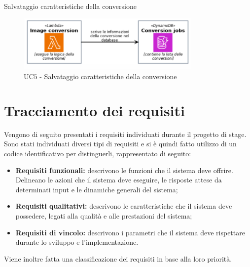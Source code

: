 \begin{usecase}{5}{Salvataggio caratteristiche della conversione}
    \begin{figure}[H]
        \centering
        \includegraphics[width=0.8\textwidth]{images/uc5.png}
        \caption{UC$5$ - Salvataggio caratteristiche della conversione}
    \end{figure}
    \label{uc:salvataggio-caratteristiche}
\end{usecase}
\clearpage

\section{Tracciamento dei requisiti}

Vengono di seguito presentati i requisiti individuati durante il progetto di
stage.\\
Sono stati individuati diversi tipi di requisiti e si è quindi fatto utilizzo di
un codice identificativo per distinguerli, rappresentato di seguito:
\begin{itemize}
    \item \textbf{Requisiti funzionali:} descrivono le funzioni che il sistema
          deve offrire. Delineano le azioni che il sistema deve eseguire, le
          risposte attese da determinati input e le dinamiche generali del sistema;
    \item \textbf{Requisiti qualitativi:} descrivono le caratteristiche che il
          sistema deve possedere, legati alla qualità e alle prestazioni del sistema;
    \item \textbf{Requisiti di vincolo:} descrivono i parametri che il sistema
          deve rispettare durante lo sviluppo e l'implementazione.
\end{itemize}
Viene inoltre fatta una classificazione dei requisiti in base alla loro
priorità.

